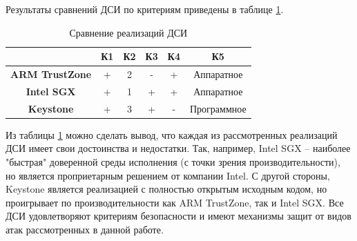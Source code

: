 Результаты сравнений ДСИ по критериям приведены в таблице \ref{table:comparsion}.

\begin{table}[!htb]
	\begin{center}
		\caption{Сравнение реализаций ДСИ}
		\label{table:comparsion}
		\begin{tabular}{|c|c|c|c|c|c|}
			\hline
			 & \bfseries К1 & \bfseries К2 & \bfseries К3 & \bfseries К4 & \bfseries К5 \\
			\hline
			\bfseries ARM TrustZone & + & 2 & - & + & Аппаратное \\ \hline
			\bfseries Intel SGX & + & 1 & + & + & Аппаратное\\ \hline
			\bfseries Keystone & + & 3 & + & - & Программное\\ \hline
		\end{tabular}
	\end{center}
\end{table}

Из таблицы \ref{table:comparsion} можно сделать вывод, что каждая из рассмотренных реализаций ДСИ имеет свои достоинства и недостатки. Так, например, Intel SGX -- наиболее "быстрая" доверенной среды исполнения (с точки зрения производительности), но является проприетарным решением от компании Intel. С другой стороны, Keystone является реализацией с полностью открытым исходным кодом, но проигрывает по производительности как ARM TrustZone, так и Intel SGX. Все ДСИ удовлетворяют критериям безопасности и имеют механизмы защит от видов атак рассмотренных в данной работе.

\pagebreak
